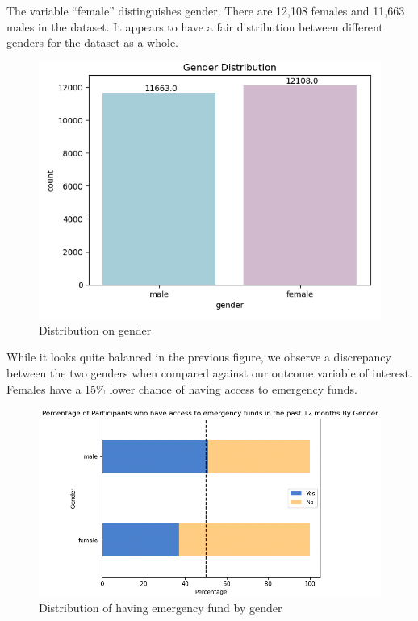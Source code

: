 \documentclass[12pt]{article}
\begin{document}
The variable ``female'' distinguishes gender. There are 12,108 females
and 11,663 males in the dataset. It appears to have a fair distribution
between different genders for the dataset as a whole.

\begin{figure}

{\centering \includegraphics[width=1\linewidth]{graphs/f24_graph2} 

}

\caption{Distribution on gender}\label{fig:unnamed-chunk-5}
\end{figure}

While it looks quite balanced in the previous figure, we observe a
discrepancy between the two genders when compared against our outcome
variable of interest. Females have a 15\% lower chance of having access
to emergency funds.

\begin{figure}

{\centering \includegraphics[width=1\linewidth]{graphs/f24_graph3} 

}

\caption{Distribution of having emergency fund by gender}\label{fig:unnamed-chunk-6}
\end{figure}
\end{document}
